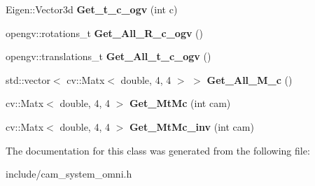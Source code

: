 \begin{DoxyCompactItemize}
\item 
Eigen\+::\+Vector3d {\bfseries Get\+\_\+t\+\_\+c\+\_\+ogv} (int c)\hypertarget{classMultiColSLAM_1_1cMultiCamSys___a1f45ac2f302bea8db20e734fc0225996}{}\label{classMultiColSLAM_1_1cMultiCamSys___a1f45ac2f302bea8db20e734fc0225996}

\item 
opengv\+::rotations\+\_\+t {\bfseries Get\+\_\+\+All\+\_\+\+R\+\_\+c\+\_\+ogv} ()\hypertarget{classMultiColSLAM_1_1cMultiCamSys___ab028b78c5dab72629fd74ec15443ade9}{}\label{classMultiColSLAM_1_1cMultiCamSys___ab028b78c5dab72629fd74ec15443ade9}

\item 
opengv\+::translations\+\_\+t {\bfseries Get\+\_\+\+All\+\_\+t\+\_\+c\+\_\+ogv} ()\hypertarget{classMultiColSLAM_1_1cMultiCamSys___aeb6629eb3f8395a9bedaa36135a9905e}{}\label{classMultiColSLAM_1_1cMultiCamSys___aeb6629eb3f8395a9bedaa36135a9905e}

\item 
std\+::vector$<$ cv\+::\+Matx$<$ double, 4, 4 $>$ $>$ {\bfseries Get\+\_\+\+All\+\_\+\+M\+\_\+c} ()\hypertarget{classMultiColSLAM_1_1cMultiCamSys___a65429b5a22428e060a0cb86c440675d2}{}\label{classMultiColSLAM_1_1cMultiCamSys___a65429b5a22428e060a0cb86c440675d2}

\item 
cv\+::\+Matx$<$ double, 4, 4 $>$ {\bfseries Get\+\_\+\+Mt\+Mc} (int cam)\hypertarget{classMultiColSLAM_1_1cMultiCamSys___a7c8caf0456b22287af685f936c389880}{}\label{classMultiColSLAM_1_1cMultiCamSys___a7c8caf0456b22287af685f936c389880}

\item 
cv\+::\+Matx$<$ double, 4, 4 $>$ {\bfseries Get\+\_\+\+Mt\+Mc\+\_\+inv} (int cam)\hypertarget{classMultiColSLAM_1_1cMultiCamSys___a36c683b72ee7277016e2ff563acc4b1b}{}\label{classMultiColSLAM_1_1cMultiCamSys___a36c683b72ee7277016e2ff563acc4b1b}

\end{DoxyCompactItemize}


The documentation for this class was generated from the following file\+:\begin{DoxyCompactItemize}
\item 
include/cam\+\_\+system\+\_\+omni.\+h\end{DoxyCompactItemize}
